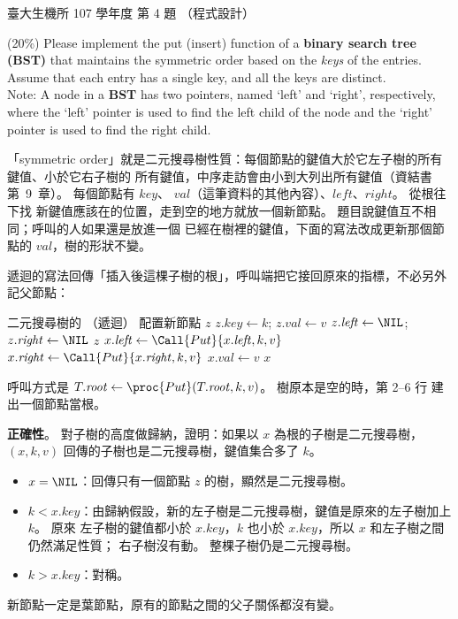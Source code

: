 \begin{pastexam}[label={px:ntu-107-bime-ds-04}]{臺大生機所 107 學年度 第 4 題}
（程式設計）

(20\%) Please implement the put (insert) function of a \textbf{binary search tree (BST)} that
maintains the symmetric order based on the \textit{keys} of the entries. Assume that each entry has
a single key, and all the keys are distinct.\\
Note: A node in a \textbf{BST} has two pointers, named `left' and `right', respectively, where the
`left' pointer is used to find the left child of the node and the `right' pointer is used to find
the right child.
\end{pastexam}

\begin{pastsoln}
「symmetric order」就是二元搜尋樹性質：每個節點的鍵值大於它左子樹的所有鍵值、小於它右子樹的
所有鍵值，中序走訪會由小到大列出所有鍵值（資結書第~9~章）。 每個節點有 $\mathit{key}$、
$\mathit{val}$（這筆資料的其他內容）、$\mathit{left}$、$\mathit{right}$。  從根往下找
新鍵值應該在的位置，走到空的地方就放一個新節點。 題目說鍵值互不相同；呼叫的人如果還是放進一個
已經在樹裡的鍵值，下面的寫法改成更新那個節點的 $\mathit{val}$，樹的形狀不變。

遞迴的寫法回傳「插入後這棵子樹的根」，呼叫端把它接回原來的指標，不必另外記父節點：

\begin{pseudo}{二元搜尋樹的 （遞迴）}
 
        \State 配置新節點 $z$
        \State $z.\mathit{key} \gets k$; $z.\mathit{val} \gets v$
        \State $z.\mathit{left} \gets \NIL$; $z.\mathit{right} \gets \NIL$
        \State \Return $z$
    \EndIf
        \State $x.\mathit{left} \gets \Call{Put}{x.\mathit{left}, k, v}$
        \State $x.\mathit{right} \gets \Call{Put}{x.\mathit{right}, k, v}$
    \Else
        \State $x.\mathit{val} \gets v$ 
    \EndIf
    \State \Return $x$
\EndFunction
\end{pseudo}

呼叫方式是 $T.\mathit{root} \gets \proc{Put}(T.\mathit{root}, k, v)$。 樹原本是空的時，第 2--6 行
建出一個節點當根。

\textbf{正確性}。 對子樹的高度做歸納，證明：如果以 $x$ 為根的子樹是二元搜尋樹，$(x, k, v)$
回傳的子樹也是二元搜尋樹，鍵值集合多了 $k$。
\begin{itemize}
\item $x = \NIL$：回傳只有一個節點 $z$ 的樹，顯然是二元搜尋樹。
\item $k < x.\mathit{key}$：由歸納假設，新的左子樹是二元搜尋樹，鍵值是原來的左子樹加上 $k$。 原來
左子樹的鍵值都小於 $x.\mathit{key}$，$k$ 也小於 $x.\mathit{key}$，所以 $x$ 和左子樹之間仍然滿足性質；
右子樹沒有動。 整棵子樹仍是二元搜尋樹。
\item $k > x.\mathit{key}$：對稱。
\end{itemize}
新節點一定是葉節點，原有的節點之間的父子關係都沒有變。


\end{pastsoln}
